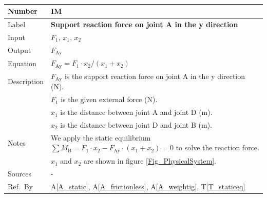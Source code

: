 \documentclass[12pt]{article}
\newcommand{\colAwidth}{0.13\textwidth}
\newcommand{\colBwidth}{0.82\textwidth}
\newcommand{\tref}[1]{T\ref{#1}}
\newcommand{\aref}[1]{A\ref{#1}}
\newcounter{instnum} %
\begin{document}
~\newline

\noindent
\begin{minipage}{\textwidth}
	\renewcommand*{\arraystretch}{1.5}
	\begin{tabular}{| p{\colAwidth} | p{\colBwidth}|}
		\hline
		\rowcolor[gray]{0.9}
		Number& IM{instnum}\theinstnum \label{I_solveFay}\\
		\hline
		Label& \bf Support reaction force on joint A in the y direction\\
		\hline
		Input& $F_\text{1}$, $x_\text{1}$, $x_\text{2}$ \\
		\hline
		Output& $F_{\text{{Ay}}}$ \\
		\hline
		Equation& $F_{\text{Ay}} = F_\text{1} \cdot x_\text{2} / (x_\text{1} + 
		x_\text{2})$ \\
		\hline
		Description&$F_{\text{Ay}}$ is the support reaction force on joint A 
		in the y direction (N).\\
		&$F_1$ is the given external force (N).\\
		&$x_1$ is the distance between joint A and joint D (m).\\
		&$x_2$ is the distance between joint D and joint B (m).\\
		\hline
		Notes& We apply the static equilibrium $\sum M_{\text{B}} = F_\text{1} 
		\cdot x_\text{2} - F_{\text{Ay}} \cdot (x_\text{1} + x_\text{2}) = 0$ 
		to solve the reaction force. \\
		&$x_1$ and $x_2$ are shown in figure \ref{Fig_PhysicalSystem}.\\
		\hline
		Sources& - \\
		\hline
		Ref.\ By & \aref{A_static}, \aref{A_frictionless}, \aref{A_weightig}, 
		\tref{T_staticeq} \\
		\hline
	\end{tabular}
\end{minipage}\\

~\newline
\end{document}
